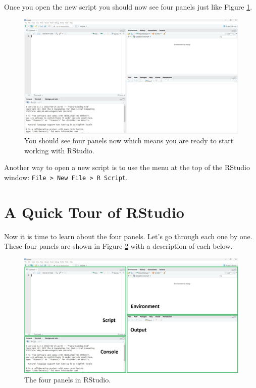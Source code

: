 \documentclass[
]{book}
\let\oldsection\section
\renewcommand{\section}{\needspace{5\baselineskip}\oldsection}
\begin{document}
Once you open the new script you should now see four panels just like Figure \ref{fig:fig5}.

\begin{figure}

{\centering \includegraphics[width=1\linewidth]{images/rstudio2} 

}

\caption{You should see four panels now which means you are ready to start working with RStudio.}\label{fig:fig5}
\end{figure}

Another way to open a new script is to use the menu at the top of the RStudio window: \texttt{File\ \textgreater{}\ New\ File\ \textgreater{}\ R\ Script}.

\section{A Quick Tour of RStudio}\label{a-quick-tour-of-rstudio}

Now it is time to learn about the four panels. Let's go through each one by one. These four panels are shown in Figure \ref{fig:fig6} with a description of each below.

\begin{figure}[H]

{\centering \includegraphics[width=1\linewidth]{images/rstudio3} 

}

\caption{The four panels in RStudio.}\label{fig:fig6}
\end{figure}
\end{document}
